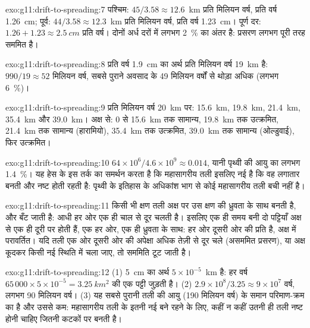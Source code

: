\begin{solution}{exo:g11:drift-to-spreading:7}
पश्चिम: $45/3.58 \approx 12.6$~km प्रति मिलियन वर्ष, प्रति वर्ष \qty{1.26}{cm};
पूर्व: $44/3.58 \approx 12.3$~km प्रति मिलियन वर्ष, प्रति वर्ष \qty{1.23}{cm}।
पूर्ण दर: $1.26 + 1.23 \approx \qty{2.5}{cm}$ प्रति वर्ष। दोनों अर्ध दरों में
लगभग \qty{2}{\percent} का अंतर है: प्रसरण लगभग पूरी तरह सममित है।
\end{solution}

\begin{solution}{exo:g11:drift-to-spreading:8}
प्रति वर्ष \qty{1.9}{cm} का अर्थ प्रति मिलियन वर्ष \qty{19}{km} है: $990/19 \approx 52$
मिलियन वर्ष, सबसे पुराने अवसाद के 49 मिलियन वर्षों से थोड़ा अधिक
(लगभग \qty{6}{\percent})।
\end{solution}

\begin{solution}{exo:g11:drift-to-spreading:9}
प्रति मिलियन वर्ष \qty{20}{km} पर: \qty{15.6}{km}, \qty{19.8}{km},
\qty{21.4}{km}, \qty{35.4}{km} और \qty{39.0}{km}। अक्ष से: 0 से
\qty{15.6}{km} तक सामान्य, \qty{19.8}{km} तक उत्क्रमित, \qty{21.4}{km} तक सामान्य
(हारामियो), \qty{35.4}{km} तक उत्क्रमित, \qty{39.0}{km} तक सामान्य (ओल्डुवाई),
फिर उत्क्रमित।
\end{solution}

\begin{solution}{exo:g11:drift-to-spreading:10}
$64 \times 10^6/4.6 \times 10^9 \approx \num{0.014}$, यानी पृथ्वी की आयु का लगभग
\qty{1.4}{\percent}। यह हेस के इस तर्क का समर्थन करता है कि
महासागरीय तली इसलिए नई है कि वह लगातार बनती और नष्ट होती रहती है: पृथ्वी के
इतिहास के अधिकांश भाग से कोई महासागरीय तली बची नहीं है।
\end{solution}

\begin{solution}{exo:g11:drift-to-spreading:11}
किसी भी क्षण तली अक्ष पर उस क्षण की ध्रुवता के साथ बनती है,
और बँट जाती है: आधी हर ओर एक ही चाल से दूर चलती है। इसलिए एक ही समय बनी
दो पट्टियाँ अक्ष से एक ही दूरी पर होती हैं, एक हर ओर,
एक ही ध्रुवता के साथ: हर ओर दूसरी ओर की प्रति है, अक्ष में
परावर्तित। यदि तली एक ओर दूसरी ओर की अपेक्षा अधिक तेज़ी से दूर चले
(असममित प्रसरण), या अक्ष कूदकर किसी नई
स्थिति में चला जाए, तो सममिति टूट जाती है।
\end{solution}

\begin{solution}{exo:g11:drift-to-spreading:12}
(1) \qty{5}{cm} का अर्थ $5 \times 10^{-5}$~\unit{km} है: हर वर्ष
$65\,000 \times 5 \times 10^{-5} = \qty{3.25}{km^2}$ की एक पट्टी जुड़ती है।
(2) $2.9 \times 10^8/3.25 \approx 9 \times 10^7$ वर्ष, लगभग 90 मिलियन
वर्ष। (3) यह सबसे पुरानी तली की आयु (190 मिलियन वर्ष) के समान परिमाण-क्रम का है
और उससे कम: महासागरीय तली के इतनी नई बने रहने के लिए,
कहीं न कहीं उतनी ही तली नष्ट होनी चाहिए जितनी कटकों पर बनती है।
\end{solution}

